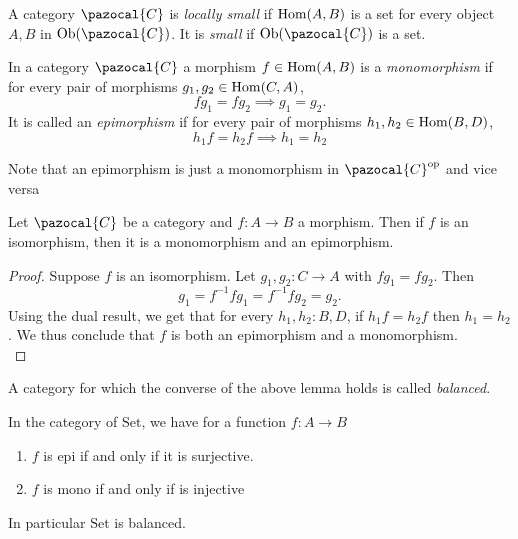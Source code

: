 \begin{definition}
    A category $\pazocal{C}$ is \textit{locally small} if $\mathrm{Hom}(A,B)$ is a set for every object $A,B$ in $\Ob(\pazocal{C})$. It is \textit{small} if $\Ob(\pazocal{C})$ is a set.
\end{definition}
\begin{definition}
    In a category $\pazocal{C}$ a morphism $f\in \mathrm{Hom}(A,B)$ is a \textit{monomorphism} if for every pair of morphisms $g_1,g_2 \in \mathrm{Hom}(C,A)$, 
    $$fg_1=fg_2\implies g_1 = g_2.$$
    It is called an \textit{epimorphism} if for every pair of morphisms $h_1,h_2\in \mathrm{Hom}(B,D)$,
    $$h_1f=h_2f\implies h_1=h_2$$    
\end{definition}
\begin{remark}
    Note that an epimorphism is just a monomorphism in $\pazocal{C}\op$ and vice versa
\end{remark}\label{IsomorphismIsEpiAndMono}
\begin{lemma}
    Let $\pazocal{C}$ be a category and $f:A\rightarrow B$ a morphism. Then if $f$ is an isomorphism, then it is a monomorphism and an epimorphism.
\end{lemma}
\begin{proof}
    Suppose $f$ is an isomorphism. Let $g_1,g_2: C \rightarrow A$ with $fg_1=fg_2$. Then 
    $$
        g_1=f^{-1}fg_1 = f^{-1}fg_2 = g_2.
    $$
    Using the dual result, we get that for every $h_1,h_2: B,D$, if $h_1f=h_2f$ then $h_1=h_2$. We thus conclude that $f$ is both an epimorphism and a monomorphism.\\
\end{proof}
\begin{definition}
    A category for which the converse of the above lemma holds is called \emph{balanced}.
\end{definition}
\begin{lemma}
    In the category of $\mathrm{Set}$, we have for a function $f: A\rightarrow B$
    \begin{enumerate}
        \item $f$ is epi if and only if it is surjective.
        \item $f$ is mono if and only if is injective
    \end{enumerate}
    In particular $\mathrm{Set}$ is balanced. 
\end{lemma}
